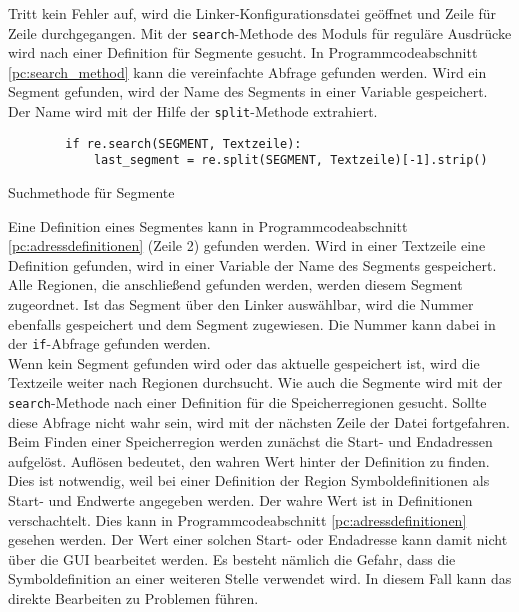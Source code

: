 Tritt kein Fehler auf, wird die Linker-Konfigurationsdatei geöffnet und Zeile für Zeile durchgegangen. 
Mit der \verb*|search|-Methode des Moduls für reguläre Ausdrücke wird nach einer Definition für Segmente gesucht. 
In Programmcodeabschnitt \ref{pc:search_method} kann die vereinfachte Abfrage gefunden werden. 
Wird ein Segment gefunden, wird der Name des Segments in einer Variable gespeichert. 
Der Name wird mit der Hilfe der \verb*|split|-Methode extrahiert.\\

\begin{listing}[H]
	\begin{verbatim}
		if re.search(SEGMENT, Textzeile):
			last_segment = re.split(SEGMENT, Textzeile)[-1].strip()
	\end{verbatim}
	\caption{Suchmethode für Segmente}
	\label{pc:search_method}
\end{listing}

%		

Eine Definition eines Segmentes kann in Programmcodeabschnitt \ref{pc:adressdefinitionen} (Zeile 2) gefunden werden.
Wird in einer Textzeile eine Definition gefunden, wird in einer Variable der Name des Segments gespeichert.
Alle Regionen, die anschließend gefunden werden, werden diesem Segment zugeordnet.
Ist das Segment über den Linker auswählbar, wird die Nummer ebenfalls gespeichert und dem Segment zugewiesen.
Die Nummer kann dabei in der \verb*|if|-Abfrage gefunden werden.\\

Wenn kein Segment gefunden wird oder das aktuelle gespeichert ist, wird die Textzeile weiter nach Regionen durchsucht.
Wie auch die Segmente wird mit der \verb*|search|-Methode nach einer Definition für die Speicherregionen gesucht.
Sollte diese Abfrage nicht wahr sein, wird mit der nächsten Zeile der Datei fortgefahren.
Beim Finden einer Speicherregion werden zunächst die Start- und Endadressen aufgelöst.
Auflösen bedeutet, den wahren Wert hinter der Definition zu finden.
Dies ist notwendig, weil bei einer Definition der Region Symboldefinitionen als Start- und Endwerte angegeben werden.
Der wahre Wert ist in Definitionen verschachtelt.
Dies kann in Programmcodeabschnitt \ref{pc:adressdefinitionen} gesehen werden.
Der Wert einer solchen Start- oder Endadresse kann damit nicht über die \ac{GUI} bearbeitet werden.
Es besteht nämlich die Gefahr, dass die Symboldefinition an einer weiteren Stelle verwendet wird.
In diesem Fall kann das direkte Bearbeiten zu Problemen führen. \\

